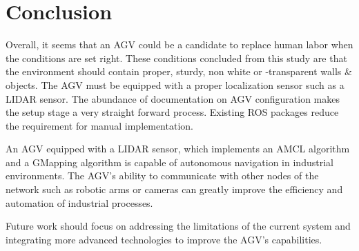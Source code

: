 \section{Conclusion}

Overall, it seems that an AGV could be a candidate to replace human labor when the conditions are set right. These conditions concluded from this study are that the environment should contain proper, sturdy, non white or -transparent walls \& objects. The AGV must be equipped with a proper localization sensor such as a LIDAR sensor.
The abundance of documentation on AGV configuration makes the setup stage a very straight forward process. Existing ROS packages reduce the requirement for manual implementation. 

An AGV equipped with a LIDAR sensor, which implements an AMCL algorithm and a GMapping algorithm is capable of autonomous navigation in industrial environments. The AGV's ability to communicate with other nodes  of the network such as robotic arms or cameras can greatly improve the efficiency and automation of industrial processes. 

Future work should focus on addressing the limitations of the current system and integrating more advanced technologies to improve the AGV's capabilities.